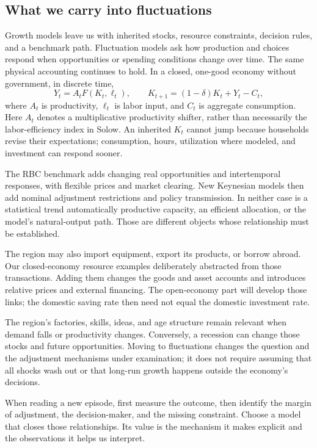 \subsection{What we carry into fluctuations}

Growth models leave us with inherited stocks, resource constraints, decision
rules, and a benchmark path. Fluctuation models ask how production and choices
respond when opportunities or spending conditions change over time. The
same physical accounting continues to hold. In a closed, one-good economy
without government, in discrete time,
\[
Y_t=A_tF(K_t,\ell_t),\qquad
K_{t+1}=(1-\delta)K_t+Y_t-C_t,
\]
where $A_t$ is productivity, $\ell_t$ is labor input, and $C_t$ is aggregate
consumption. Here $A_t$ denotes a multiplicative productivity shifter, rather
than necessarily the labor-efficiency index in Solow. An inherited $K_t$
cannot jump because households revise their expectations; consumption,
hours, utilization where modeled, and investment can respond sooner.

The RBC benchmark adds changing real opportunities and intertemporal
responses, with flexible prices and market clearing. New Keynesian models
then add nominal adjustment restrictions and policy transmission. In neither
case is a statistical trend automatically productive capacity, an efficient
allocation, or the model's natural-output path. Those are different objects
whose relationship must be established.

The region may also import equipment, export its products, or borrow abroad.
Our closed-economy resource examples deliberately abstracted from those
transactions. Adding them changes the goods and asset accounts and introduces
relative prices and external financing. The open-economy part will develop
those links; the domestic saving rate then need not equal the domestic
investment rate.

The region's factories, skills, ideas, and age structure remain relevant
when demand falls or productivity changes. Conversely, a recession can
change those stocks and future opportunities. Moving to fluctuations changes
the question and the adjustment mechanisms under examination; it does not
require assuming that all shocks wash out or that long-run growth happens
outside the economy's decisions.

When reading a new episode, first measure the outcome, then identify the
margin of adjustment, the decision-maker, and the missing constraint.
Choose a model that closes those relationships. Its value is the mechanism
it makes explicit and the observations it helps us interpret.
